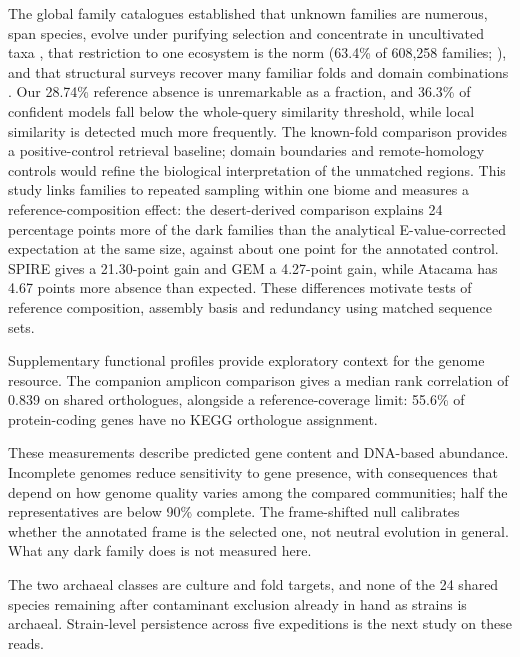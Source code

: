 \documentclass[11pt]{article}
\begin{document}
The global family catalogues established that unknown families are numerous, span species, evolve
under purifying selection and concentrate in uncultivated taxa
\citep{rodriguezdelrio2024fesnov,pavlopoulos2023darkmatter,vanni2022agnostos}, that restriction to
one ecosystem is the norm (63.4\% of 608{,}258 families; \citealp{aplakidou2025quadrupling}), and
that structural surveys recover many familiar folds and domain combinations
\citep{lau2024ted,yeo2025afesm}. Our 28.74\% reference absence is unremarkable as a fraction, and
36.3\% of confident models fall below the whole-query similarity threshold, while local
similarity is detected much more frequently. The known-fold comparison provides a positive-control
retrieval baseline; domain boundaries and remote-homology controls would refine the biological
interpretation of the unmatched regions. This study links families to repeated sampling within one biome and measures a reference-composition effect: the desert-derived comparison explains 24 percentage points more of the dark families
than the analytical E-value-corrected expectation at the same size, against about one point for the annotated control. SPIRE gives a 21.30-point gain and GEM a 4.27-point gain, while Atacama has 4.67 points more absence than expected. These differences motivate tests of reference composition, assembly basis and redundancy using matched sequence sets.

Supplementary functional profiles provide exploratory context for the genome resource.
The companion amplicon comparison gives a median rank correlation of 0.839 on shared
orthologues, alongside a reference-coverage limit: 55.6\% of protein-coding genes have no
KEGG orthologue assignment.

These measurements describe predicted gene content and DNA-based abundance. Incomplete genomes
reduce sensitivity to gene presence, with consequences that depend on how genome quality varies
among the compared communities; half the representatives
are below 90\% complete. The frame-shifted null
calibrates whether the annotated frame is the selected one, not neutral evolution in general. What
any dark family does is not measured here.

The two archaeal classes are culture and fold targets, and none of the 24 shared species remaining after contaminant exclusion already in
hand as strains is archaeal. Strain-level persistence across five expeditions is the next study on
these reads.

\end{document}
